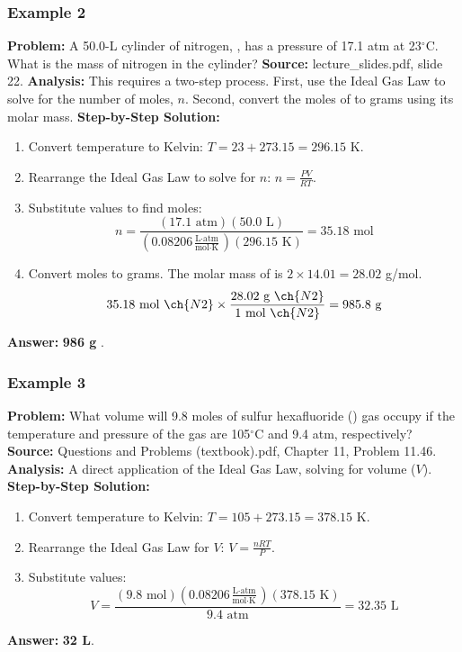 \documentclass{article}
\begin{document}
\subsubsection{Example 2}
\textbf{Problem:} A 50.0-L cylinder of nitrogen, , has a pressure of 17.1 atm at 23$^\circ$C. What is the mass of nitrogen in the cylinder?
\textbf{Source:} lecture\_slides.pdf, slide 22.
\textbf{Analysis:} This requires a two-step process. First, use the Ideal Gas Law to solve for the number of moles, $n$. Second, convert the moles of  to grams using its molar mass.
\textbf{Step-by-Step Solution:}
\begin{enumerate}
    \item Convert temperature to Kelvin: $T = 23 + 273.15 = 296.15$ K.
    \item Rearrange the Ideal Gas Law to solve for $n$: $n = \frac{PV}{RT}$.
    \item Substitute values to find moles:
    \[ n = \frac{(17.1 \text{ atm})(50.0 \text{ L})}{(0.08206 \frac{\text{L}\cdot\text{atm}}{\text{mol}\cdot\text{K}})(296.15 \text{ K})} = 35.18 \text{ mol} \]
    \item Convert moles to grams. The molar mass of  is $2 \times 14.01 = 28.02$ g/mol.
    \[ 35.18 \text{ mol } \ch{N2} \times \frac{28.02 \text{ g } \ch{N2}}{1 \text{ mol } \ch{N2}} = 985.8 \text{ g} \]
\end{enumerate}
\textbf{Answer:} \textbf{986 g }.

\subsubsection{Example 3}
\textbf{Problem:} What volume will 9.8 moles of sulfur hexafluoride () gas occupy if the temperature and pressure of the gas are 105$^\circ$C and 9.4 atm, respectively?
\textbf{Source:} Questions and Problems (textbook).pdf, Chapter 11, Problem 11.46.
\textbf{Analysis:} A direct application of the Ideal Gas Law, solving for volume ($V$).
\textbf{Step-by-Step Solution:}
\begin{enumerate}
    \item Convert temperature to Kelvin: $T = 105 + 273.15 = 378.15$ K.
    \item Rearrange the Ideal Gas Law for $V$: $V = \frac{nRT}{P}$.
    \item Substitute values:
    \[ V = \frac{(9.8 \text{ mol})(0.08206 \frac{\text{L}\cdot\text{atm}}{\text{mol}\cdot\text{K}})(378.15 \text{ K})}{9.4 \text{ atm}} = 32.35 \text{ L} \]
\end{enumerate}
\textbf{Answer:} \textbf{32 L}.
\end{document}
